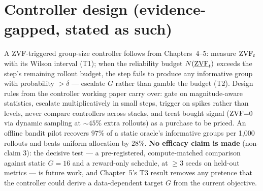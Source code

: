 \section{Controller design (evidence-gapped, stated as such)}
A ZVF-triggered group-size controller follows from Chapters~4--5: measure
$\mathrm{ZVF}_t$ with its Wilson interval (T1); when the reliability budget
$N(\underline{\mathrm{ZVF}}_t)$ exceeds the step's remaining rollout budget, the step
fails to produce any informative group with probability $>\delta$ --- escalate
$G$ rather than gamble the budget (T2). Design rules from the controller
working paper carry over: gate on magnitude-aware statistics, escalate
multiplicatively in small steps, trigger on spikes rather than levels, never
compare controllers across stacks, and treat bought signal ($\mathrm{ZVF}{=}0$ via
dynamic sampling at ${\sim}45\%$ extra rollouts) as a purchase to be priced.
An offline bandit pilot recovers $97\%$ of a static oracle's informative
groups per 1{,}000 rollouts and beats uniform allocation by $28\%$.
\textbf{No efficacy claim is made} (non-claim 3): the decisive test --- a
pre-registered, compute-matched comparison against static $G{=}16$ and a
reward-only schedule, at $\ge3$ seeds on held-out metrics --- is future work,
and Chapter~5's T3 result removes any pretence that the controller could
derive a data-dependent target $G$ from the current objective.
